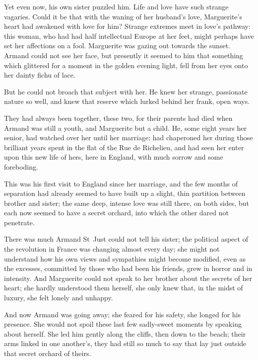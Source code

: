 Yet even now, his own sister puzzled him. Life and love have such strange vagaries. Could it be that with the waning of her husband's love, Marguerite's heart had awakened with love for him? Strange extremes meet in love's pathway: this woman, who had had half intellectual Europe at her feet, might perhaps have set her affections on a fool. Marguerite was gazing out towards the sunset. Armand could not see her face, but presently it seemed to him that something which glittered for a moment in the golden evening light, fell from her eyes onto her dainty fichu of lace.

But he could not broach that subject with her. He knew her strange, passionate nature so well, and knew that reserve which lurked behind her frank, open ways.

They had always been together, these two, for their parents had died when Armand was still a youth, and Marguerite but a child. He, some eight years her senior, had watched over her until her marriage; had chaperoned her during those brilliant years spent in the flat of the Rue de Richelieu, and had seen her enter upon this new life of hers, here in England, with much sorrow and some foreboding.

This was his first visit to England since her marriage, and the few months of separation had already seemed to have built up a slight, thin partition between brother and sister; the same deep, intense love was still there, on both sides, but each now seemed to have a secret orchard, into which the other dared not penetrate.

There was much Armand St~Just could not tell his sister; the political aspect of the revolution in France was changing almost every day; she might not understand how his own views and sympathies might become modified, even as the excesses, committed by those who had been his friends, grew in horror and in intensity. And Marguerite could not speak to her brother about the secrets of her heart; she hardly understood them herself, she only knew that, in the midst of luxury, she felt lonely and unhappy.

And now Armand was going away; she feared for his safety, she longed for his presence. She would not spoil these last few sadly-sweet moments by speaking about herself. She led him gently along the cliffs, then down to the beach; their arms linked in one another's, they had still so much to say that lay just outside that secret orchard of theirs.
